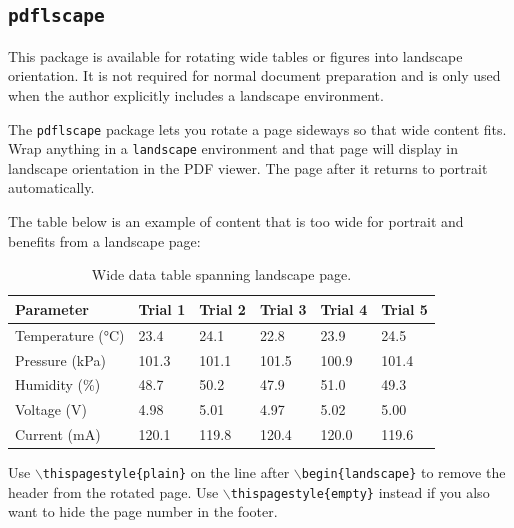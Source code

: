 \begin{landscape} 	  %
\thispagestyle{plain} %
\subsection{\texttt{pdflscape}}
\noindent\colorbox{themecolour!15}{\parbox{\linewidth}{\small This package is available for rotating wide tables or figures into landscape orientation. It is not required for normal document preparation and is only used when the author explicitly includes a landscape environment.}}\vspace{0.5\baselineskip}

The \texttt{pdflscape} package lets you rotate a page sideways so that wide content fits. Wrap anything in a \texttt{landscape} environment and that page will display in landscape orientation in the PDF viewer. The page after it returns to portrait automatically.

The table below is an example of content that is too wide for portrait and benefits from a landscape page:

\begin{table}[H]
	\centering
	\caption{Wide data table spanning landscape page.}
	\label{tab:landscape}
	\begin{tabularx}{\linewidth}{@{}lXXXXX@{}}
		\toprule
		Parameter & Trial 1 & Trial 2 & Trial 3 & Trial 4 & Trial 5 \\
		\midrule
		Temperature (\si{\celsius})     & 23.4 & 24.1 & 22.8 & 23.9 & 24.5 \\
		Pressure (\si{\kilo\pascal})  & 101.3 & 101.1 & 101.5 & 100.9 & 101.4 \\
		Humidity (\%)               & 48.7 & 50.2 & 47.9 & 51.0 & 49.3 \\
		Voltage (\si{\volt})          & 4.98 & 5.01 & 4.97 & 5.02 & 5.00 \\
		Current (\si{\milli\ampere}) & 120.1 & 119.8 & 120.4 & 120.0 & 119.6 \\
		\bottomrule
	\end{tabularx}
\end{table}

Use \texttt{$\backslash$thispagestyle\{plain\}} on the line after \texttt{$\backslash$begin\{landscape\}} to remove the header from the rotated page. Use \texttt{$\backslash$thispagestyle\{empty\}} instead if you also want to hide the page number in the footer.
\end{landscape} %

